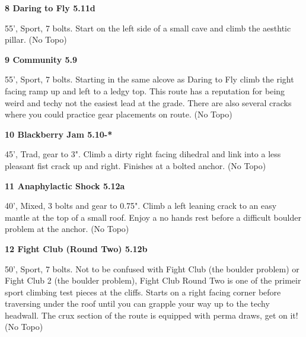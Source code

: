 \begin{multicols}{2}
\needspace{1.5cm}
\label{rt:Daring to Fly}
\colorbox{RoyalBlue!20}{
\parbox{0.95\linewidth}{
\textbf{
8 Daring to Fly 5.11d  
}}}
\begin{adjustwidth}{0.5cm}{}			
55', Sport, 7 bolts. Start on the left side of a small cave and climb the aesthtic pillar.
  (No Topo)
\end{adjustwidth}




\needspace{1.5cm}
\label{rt:Community}
\colorbox{green!20}{
\parbox{0.95\linewidth}{
\textbf{
9 Community 5.9  
}}}
\begin{adjustwidth}{0.5cm}{}			
55', Sport, 7 bolts. Starting in the same alcove as Daring to Fly climb the right facing ramp up and left to a ledgy top. This route has a reputation for being weird and techy not the easiest lead at the grade. There are also several cracks where you could practice gear placements on route.
  (No Topo)
\end{adjustwidth}




\needspace{1.5cm}
\label{rt:Blackberry Jam}
\colorbox{RoyalBlue!20}{
\parbox{0.95\linewidth}{
\textbf{
10 Blackberry Jam 5.10-*  
}}}
\begin{adjustwidth}{0.5cm}{}			
45', Trad, gear to 3". Climb a dirty right facing dihedral and link into a less pleasant fist crack up and right. Finishes at a bolted anchor.
  (No Topo)
\end{adjustwidth}




\needspace{1.5cm}
\label{rt:Anaphylactic Shock}
\colorbox{Goldenrod!20}{
\parbox{0.95\linewidth}{
\textbf{
11 Anaphylactic Shock 5.12a  
}}}
\begin{adjustwidth}{0.5cm}{}			
40', Mixed, 3 bolts and gear to 0.75". Climb a left leaning crack to an easy mantle at the top of a small roof. Enjoy a no hands rest before a difficult boulder problem at the anchor.
  (No Topo)
\end{adjustwidth}




\needspace{1.5cm}
\label{rt:Fight Club (Round Two)}
\colorbox{Goldenrod!20}{
\parbox{0.95\linewidth}{
\textbf{
12 Fight Club (Round Two) 5.12b  
}}}
\begin{adjustwidth}{0.5cm}{}			
50', Sport, 7 bolts. Not to be confused with Fight Club (the boulder problem) or Fight Club 2 (the boulder problem), Fight Club Round Two is one of the primeir sport climbing test pieces at the cliffs. Starts on a right facing corner before traversing under the roof until you can grapple your way up to the techy headwall. The crux section of the route is equipped with perma draws, get on it!
  (No Topo)
\end{adjustwidth}





\end{multicols}
